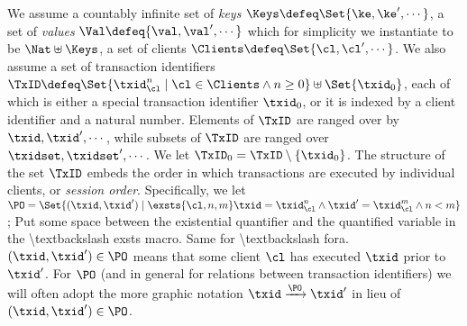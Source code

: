 

We assume a countably infinite set of \emph{keys} $\Keys \defeq \Set{\ke, \ke', \cdots}$, 
a set of \emph{values} $\Val \defeq \{\val, \val', \cdots\}$ which for simplicity we instantiate to be 
$\Nat \uplus \Keys$, a set of clients $\Clients \defeq \Set{\cl, \cl',\cdots}$. 
We also assume a set of transaction identifiers $\TxID \defeq \Set{ \txid_{\cl}^{n} \mid \cl \in \Clients \wedge n \geq 0 } 
\uplus \Set{\txid_{0}}$,
each of which is either a special transaction identifier $\txid_0$, 
or it is indexed by a client identifier and a natural number. 
Elements of $\TxID$ are ranged over by $\txid, \txid', \cdots$, 
while subsets of $\TxID$ are ranged over $\txidset, \txidset', \cdots$. 
We let $\TxID_{0} = \TxID \setminus \{ \txid_0\}$.
The structure of the set $\TxID$  
embeds the order in which transactions are executed by individual clients, or \emph{session order}. 
Specifically, we let $\PO = \Set{ (\txid, \txid') \mid \exsts{ \cl, n,m } \txid = \txid_{\cl}^{n} \wedge 
\txid' = \txid_{\cl}^{m} \wedge n < m}$; 
\ac{Put some space between the existential quantifier and the quantified variable in the \textbackslash exsts macro. 
Same for \textbackslash fora.}
$(\txid, \txid') \in \PO$ means that 
some client $\cl$ has executed $\txid$ prior to $\txid'$. For $\PO$ (and in general  
for relations between transaction identifiers) we will often adopt the more graphic notation 
$\txid \xrightarrow{\PO} \txid'$ in lieu of $(\txid, \txid') \in \PO$.

